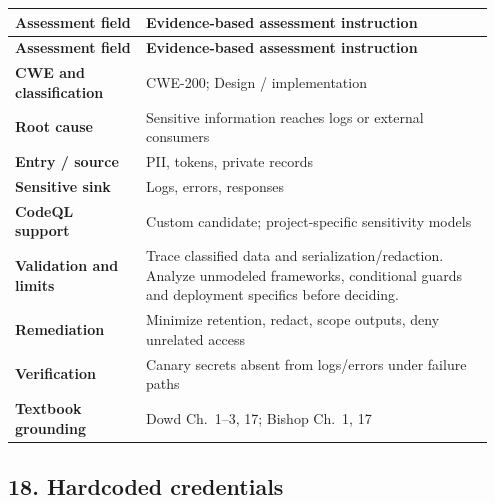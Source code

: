 \documentclass[11pt,letterpaper,oneside]{book}
\begin{document}
\small
\setlength{\tabcolsep}{2pt}
\renewcommand{\arraystretch}{1.18}
\begin{longtable}{>{\raggedright\arraybackslash}p{0.26\linewidth}>{\raggedright\arraybackslash}p{0.69\linewidth}}
\toprule
\textbf{Assessment field} & \textbf{Evidence-based assessment instruction}\\
\midrule
\endfirsthead
\toprule
\textbf{Assessment field} & \textbf{Evidence-based assessment instruction}\\
\midrule
\endhead
\textbf{CWE and classification} & CWE-200; Design / implementation\\
\textbf{Root cause} & Sensitive information reaches logs or external consumers\\
\textbf{Entry / source} & PII, tokens, private records\\
\textbf{Sensitive sink} & Logs, errors, responses\\
\textbf{CodeQL support} & Custom candidate; project-specific sensitivity models\\
\textbf{Validation and limits} & Trace classified data and serialization/redaction. Analyze unmodeled frameworks, conditional guards and deployment specifics before deciding.\\
\textbf{Remediation} & Minimize retention, redact, scope outputs, deny unrelated access\\
\textbf{Verification} & Canary secrets absent from logs/errors under failure paths\\
\textbf{Textbook grounding} & Dowd Ch.~1--3, 17; Bishop Ch.~1, 17\\
\bottomrule
\end{longtable}
\normalsize

\subsection{18. Hardcoded credentials}
\end{document}
